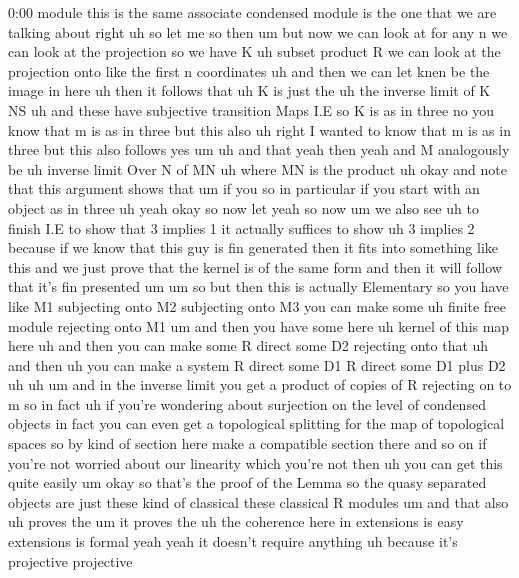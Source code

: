 \begin{unfinished}{0:00}
module  this  is  the  same  associate
condensed  module  is  the  one  that  we  are
talking  about  right  uh  so  let  me  so  then
um  but  now  we  can  look  at  for  any  n  we
can  look  at  the  projection  so  we  have  K
uh  subset  product  R  we  can  look  at  the
projection  onto  like  the  first  n
coordinates
uh  and  then  we  can  let  knen  be  the  image
in  here
uh  then  it  follows  that  uh  K  is  just  the
uh  the  inverse  limit  of  K
NS  uh  and  these  have  subjective
transition  Maps  I.E  so  K  is  as  in
three  no  you  know  that  m  is  as  in  three
but  this  also
uh  right  I  wanted  to  know  that  m  is  as
in  three  but  this  also  follows  yes
um  uh  and  that  yeah  then  yeah  and
M  analogously  be  uh  inverse  limit  Over  N
of  MN  uh  where  MN  is  the
product
uh
okay  and  note  that  this  argument  shows
that
um  if  you  so  in  particular  if  you  start
with  an  object  as  in  three  uh  yeah  okay
so  now  let  yeah  so  now  um  we  also
see  uh  to  finish  I.E  to  show  that  3
implies  1  it  actually  suffices  to
show  uh  3  implies
2  because  if  we  know  that  this  guy  is
fin  generated  then  it  fits  into
something  like  this  and  we  just  prove
that  the  kernel  is  of  the  same  form  and
then  it  will  follow  that  it's  fin
presented
um  um  so  but  then  this  is  actually
Elementary  so  you  have  like  M1
subjecting  onto  M2  subjecting  onto
M3  you  can  make  some  uh  finite  free
module  rejecting  onto
M1  um  and
then  you  have  some  here  uh  kernel  of
this  map  here  uh  and  then  you  can  make
some  R  direct  some  D2  rejecting  onto
that  uh  and  then  uh  you  can  make  a
system  R  direct  some  D1  R  direct  some  D1
plus
D2
uh
uh  um  and  in  the  inverse  limit  you  get  a
product  of  copies  of  R  rejecting  on  to
m
so  in  fact  uh  if  you're  wondering  about
surjection  on  the  level  of  condensed
objects  in  fact  you  can  even  get  a
topological  splitting  for  the  map  of
topological  spaces  so  by  kind  of  section
here
make  a  compatible  section  there  and  so
on  if  you're  not  worried  about  our
linearity  which  you're  not  then  uh  you
can  get  this  quite
easily
um  okay  so  that's  the  proof  of  the
Lemma  so  the  quasy  separated  objects  are
just  these  kind  of
classical  these  classical  R
modules  um  and  that
also  uh  proves
the  um  it  proves  the  uh  the  coherence
here  in  extensions  is  easy  extensions  is
formal  yeah  yeah  it  doesn't  require
anything
uh  because  it's  projective  projective

\end{unfinished}
